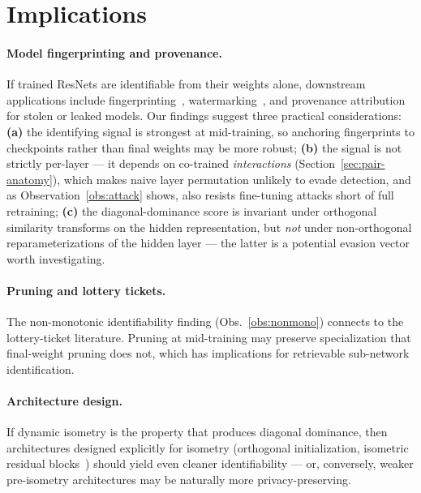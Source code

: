 \documentclass[10pt]{article}
\theoremstyle{remark}
\begin{document}
\section{Implications}

\paragraph{Model fingerprinting and provenance.} If trained ResNets are
identifiable from their weights alone, downstream applications include
fingerprinting~\cite{lukas2022deep}, watermarking~\cite{adi2018turning},
and provenance attribution for stolen or leaked models. Our findings
suggest three practical considerations: \textbf{(a)} the identifying
signal is strongest at mid-training, so anchoring fingerprints to
checkpoints rather than final weights may be more robust;
\textbf{(b)} the signal is not strictly per-layer --- it depends on
co-trained \emph{interactions} (Section~\ref{sec:pair-anatomy}), which makes
naive layer permutation unlikely to evade detection, and as
Observation~\ref{obs:attack} shows, also resists fine-tuning attacks
short of full retraining;
\textbf{(c)} the diagonal-dominance score is invariant under
orthogonal similarity transforms on the hidden representation, but
\emph{not} under non-orthogonal reparameterizations of the hidden
layer --- the latter is a potential evasion vector worth investigating.

\paragraph{Pruning and lottery tickets.} The non-monotonic
identifiability finding (Obs.~\ref{obs:nonmono}) connects to the
lottery-ticket literature. Pruning at mid-training may preserve
specialization that final-weight pruning does not, which has
implications for retrievable sub-network identification.

\paragraph{Architecture design.} If dynamic isometry is the property
that produces diagonal dominance, then architectures designed
explicitly for isometry (orthogonal initialization, isometric residual
blocks~\cite{xiao2018dyn}) should yield even cleaner identifiability ---
or, conversely, weaker pre-isometry architectures may be naturally
more privacy-preserving.
\end{document}
